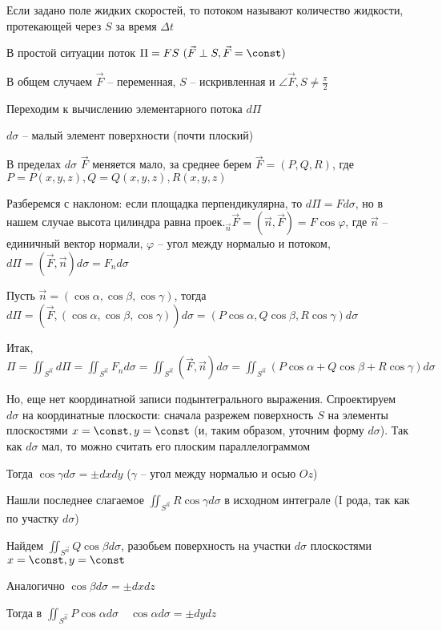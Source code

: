 \documentclass[12pt]{article}
\begin{document}
\begin{enumerate}[label*=\textbf{\arabic** }]
    Если задано поле жидких скоростей, то потоком называют количество жидкости, протекающей через $S$ за время $\Delta t$

    В простой ситуации поток $\Pi = FS \ (\vec{F} \perp S, \vec{F} = \const)$

    В общем случаем $\vec{F}$ -- переменная, $S$ -- искривленная и $\angle \vec{F}, S \neq \frac{\pi}{2}$

    Переходим к вычислению элементарного потока $d\Pi$

    $d\sigma$ -- малый элемент поверхности (почти плоский)

    В пределах $d\sigma$ $\vec{F}$ меняется мало, за среднее берем $\vec{F} = (P, Q, R)$, где $P = P(x, y, z), Q = Q(x, y, z), R(x, y, z)$

    Разберемся с наклоном: если площадка перпендикулярна, то $d\Pi = F d\sigma$,
    но в нашем случае высота цилиндра равна $\text{проек.}_{\vec{n}} \vec{F} = (\vec{n}, \vec{F}) = F \cos\varphi$, где $\vec{n}$ -- единичный вектор нормали, $\varphi$ -- угол между нормалью и потоком,
    $d\Pi = (\vec{F}, \vec{n}) d\sigma = F_n d\sigma$

    Пусть $\vec{n} = (\cos\alpha, \cos\beta, \cos\gamma)$, тогда $d\Pi = (\vec{F}, (\cos\alpha, \cos\beta, \cos\gamma)) d\sigma =
    (P\cos\alpha, Q\cos\beta, R\cos\gamma)d\sigma$

    Итак, $\Pi = \iint_{S^{\vec{n}}} d\Pi = \iint_{S^{\vec{n}}} F_n d\sigma = \iint_{S^{\vec{n}}} (\vec{F}, \vec{n})d\sigma = \iint_{S^{\vec{n}}} (P\cos\alpha + Q\cos\beta + R\cos\gamma)d\sigma$

    Но, еще нет координатной записи подынтегрального выражения. Спроектируем $d\sigma$ на координатные плоскости: сначала разрежем поверхность $S$ на элементы плоскостями $x = \const, y = \const$ (и, таким образом, уточним форму $d\sigma$). Так как $d\sigma$ мал, то можно считать его плоским параллелограммом

    Тогда $\cos\gamma d\sigma = \pm dxdy$ ($\gamma$ -- угол между нормалью и осью $Oz$)

    Нашли последнее слагаемое $\iint_{S^{\vec{n}}} R\cos\gamma d\sigma$ в исходном интеграле (I рода, так как по участку $d\sigma$)

    Найдем $\iint_{S^{\vec{n}}} Q\cos\beta d\sigma$, разобьем поверхность на участки $d\sigma$ плоскостями $x = \const, y = \const$

    Аналогично $\cos\beta d\sigma = \pm dxdz$

    Тогда в $\iint_{S^{\vec{n}}} P\cos\alpha d\sigma \quad \cos\alpha d\sigma = \pm dydz$


\end{enumerate}
\end{document}
